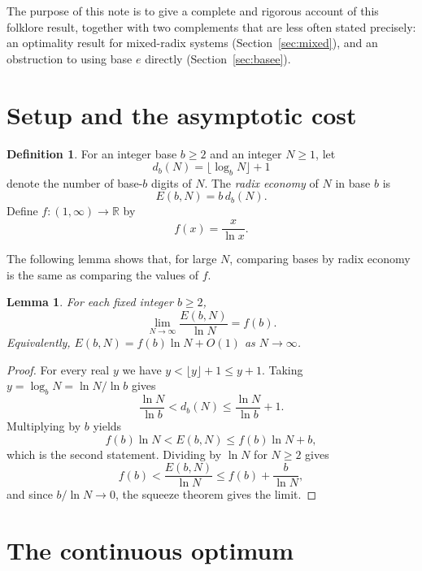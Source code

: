 \documentclass[11pt]{amsart}
\newtheorem{lemma}[theorem]{Lemma}
\theoremstyle{definition}
\newtheorem{definition}[theorem]{Definition}
\theoremstyle{remark}
\numberwithin{equation}{section}
\newcommand{\R}{\mathbb{R}}
\begin{document}
The purpose of this note is to give a complete and rigorous account of this
folklore result, together with two complements that are less often stated
precisely: an optimality result for mixed-radix systems
(Section~\ref{sec:mixed}), and an obstruction to using base $e$ directly
(Section~\ref{sec:basee}).

\section{Setup and the asymptotic cost}

\begin{definition}
For an integer base $b\ge 2$ and an integer $N\ge 1$, let
\[
  d_b(N) = \lfloor \log_b N \rfloor + 1
\]
denote the number of base-$b$ digits of $N$. The \emph{radix economy} of $N$
in base $b$ is
\[
  E(b,N) = b\, d_b(N).
\]
Define $f\colon(1,\infty)\to\R$ by
\[
  f(x) = \frac{x}{\ln x}.
\]
\end{definition}

The following lemma shows that, for large $N$, comparing bases by radix
economy is the same as comparing the values of $f$.

\begin{lemma}\label{lem:asymp}
For each fixed integer $b\ge 2$,
\[
  \lim_{N\to\infty} \frac{E(b,N)}{\ln N} = f(b).
\]
Equivalently, $E(b,N) = f(b)\ln N + O(1)$ as $N\to\infty$.
\end{lemma}

\begin{proof}
For every real $y$ we have $y < \lfloor y\rfloor + 1 \le y+1$. Taking
$y = \log_b N = \ln N/\ln b$ gives
\[
  \frac{\ln N}{\ln b} < d_b(N) \le \frac{\ln N}{\ln b} + 1 .
\]
Multiplying by $b$ yields
\begin{equation}\label{eq:sandwich}
  f(b)\ln N < E(b,N) \le f(b)\ln N + b,
\end{equation}
which is the second statement. Dividing by $\ln N$ for $N\ge 2$ gives
\[
  f(b) < \frac{E(b,N)}{\ln N} \le f(b) + \frac{b}{\ln N},
\]
and since $b/\ln N\to 0$, the squeeze theorem gives the limit.
\end{proof}

\section{The continuous optimum}
\end{document}
